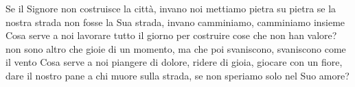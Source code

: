 \beginchorus
Se il Signore non costruisce la città,
invano noi mettiamo pietra su pietra
se la nostra strada non fosse la Sua strada,
invano camminiamo, camminiamo insieme
\endchorus
\beginverse
Cosa serve a noi lavorare tutto il giorno
per costruire cose che non han valore?
non sono altro che gioie di un momento,
ma che poi svaniscono, svaniscono come il vento
Cosa serve a noi piangere di dolore,
ridere di gioia, giocare con un fiore,
dare il nostro pane a chi muore sulla strada,
se non speriamo solo nel Suo amore?
\endverse
\endsong
